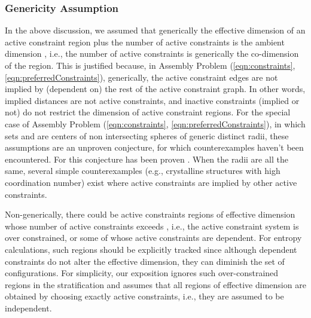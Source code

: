 \documentclass[]{article}
\newcommand{\ctwo}{\ref{eqn:preferredConstraints}}
\newcommand{\cone}{\ref{eqn:constraints}}
\begin{document}
\subsubsection{Genericity Assumption}
\label{sec:genericity}
In the above discussion, we assumed that 
generically the effective dimension of an active constraint region plus the
number of active constraints is the ambient dimension , i.e., the number of active
constraints is generically the co-dimension of the region. This is
justified because, in Assembly Problem (\cone, \ctwo), generically,
the active constraint edges are not implied by
(dependent on) the rest of the active constraint graph. 
In other words, implied distances are not active constraints, and
inactive constraints (implied or not) do not restrict the dimension of active constraint regions.
For the special case of Assembly Problem (\cone, \ctwo), in which sets  and  are
centers of non intersecting spheres of generic distinct radii, these
assumptions are an unproven conjecture, for which counterexamples haven't been
encountered. For  this conjecture has been proven \cite{connelly:2019:StickyDisks}.
When the radii are all the same, several simple counterexamples (e.g.,
crystalline structures with high coordination number) exist
where active constraints are implied by other active constraints. 

Non-generically, there could be active constraints regions of effective
dimension  whose number of active constraints exceeds ,
i.e., the active constraint system is over constrained, or some of whose active
constraints are dependent. For entropy calculations, such regions should be
explicitly tracked since although dependent constraints do not alter the
effective dimension, they can diminish the set of configurations. For
simplicity, our exposition ignores such over-constrained regions in the
stratification and assumes that all regions of effective dimension  are
obtained by choosing exactly  active constraints, i.e.,
they are assumed to be independent.
\end{document}
